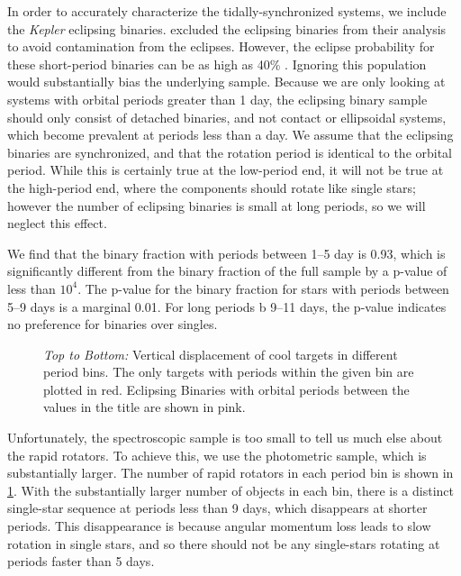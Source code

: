 \documentclass[manuscript]{aastex6}
\newcommand{\Kepler}{\mbox{\textit{Kepler}}}
\begin{document}
In order to accurately characterize the tidally-synchronized systems, we
include the \Kepler{} eclipsing binaries. \citep{McQuillan14} excluded the
eclipsing binaries from their analysis to avoid contamination from the
eclipses. However, the eclipse probability for these short-period binaries can
be as high as 40\% \citep{Kirk16}. Ignoring this population would substantially
bias the underlying sample. Because we are only looking at systems with orbital
periods greater than 1 day, the eclipsing binary sample should only consist of
detached binaries, and not contact or ellipsoidal systems, which become
prevalent at periods less than a day. We assume that the eclipsing binaries are
synchronized, and that the rotation period is identical to the orbital period.
While this is certainly true at the low-period end, it will not be true at the
high-period end, where the components should rotate like single stars; 
however the number of eclipsing binaries is small at long periods, so we will
neglect this effect.

We find that the binary fraction with periods between 1--5 day is 0.93, which
is significantly different from the binary fraction of the full sample by a
p-value of less than \(10^4\). The p-value for the binary fraction for stars
with periods between 5--9 days is a marginal 0.01. For long periods b
9--11 days, the p-value indicates no preference for binaries over singles.

\begin{figure}[htb]
    \centering
    \caption{\emph{Top to Bottom:} Vertical displacement of cool
        \citet{McQuillan14} targets in different period bins. The only targets
        with periods within the given bin are plotted in red. Eclipsing 
        Binaries with orbital periods between the values in the title are 
    shown in pink.}\label{fig:mcq_rapid_excess}
\end{figure}

Unfortunately, the spectroscopic sample is too small to tell us much else about
the rapid rotators. To achieve this, we use the photometric sample, which is
substantially larger. The number of rapid rotators in each period bin is shown
in \cref{fig:mcq_rapid_excess}. With the substantially larger number of objects
in each bin, there is a distinct single-star sequence at
periods less than 9 days, which disappears at shorter periods. This
disappearance is because angular momentum loss leads to slow rotation in single
stars, and so there should not be any single-stars rotating at periods faster
than 5 days.
\end{document}
